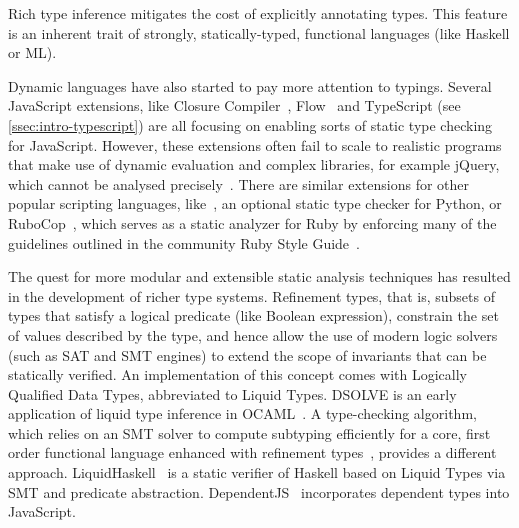 \documentclass[acmsmall, review, anonymous]{acmart}\settopmatter{printfolios=true,printccs=false,printacmref=false}
\begin{document}
Rich type inference mitigates the cost
of explicitly annotating types. This feature is an
inherent trait of strongly, statically-typed, functional languages (like Haskell or ML).


Dynamic languages have also started to pay more attention to typings. Several
JavaScript extensions, like Closure Compiler~\citep{closure}, Flow~\cite{flow} and
TypeScript (see \cref{ssec:intro-typescript}) are all focusing on enabling
sorts of static type checking for JavaScript.
%
%
However, these
extensions often fail to scale to realistic programs that make use of dynamic
evaluation and complex libraries, for example jQuery, which cannot be analysed
precisely~\cite{jensen2009}.
%
There are similar extensions for other popular scripting languages,
like~\citep{mypy}, an optional static type checker for Python,
or RuboCop~\citep{rubycop}, which serves as a static analyzer for Ruby by enforcing many of the guidelines
outlined in the community Ruby Style Guide~\citep{rubystyle}.

The quest for more modular and extensible static analysis techniques has
resulted in the development of richer type systems.
Refinement types, that is, subsets of types that satisfy a logical predicate (like Boolean expression),
constrain the set of values described by the type, and hence allow the use of
modern logic solvers (such as SAT and SMT engines) to extend the
scope of invariants that can be statically verified.
An implementation of this concept comes with Logically Qualified Data Types,
abbreviated to Liquid Types.
DSOLVE is an early application of liquid type inference in OCAML~\citep{liquid}.
A type-checking algorithm, which relies on an SMT solver
to compute subtyping efficiently for a core, first order functional language
enhanced with refinement types~\citep{semanticSMT}, provides a different
approach.
LiquidHaskell~\citep{refHaskell} is a static verifier of
Haskell based on Liquid Types via SMT and predicate
abstraction.
DependentJS~\citep{dependentJS} incorporates dependent types into JavaScript.
\end{document}
